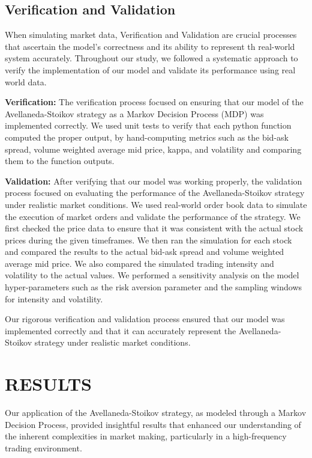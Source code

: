 \documentclass[letterpaper, 10 pt, conference]{ieeeconf}  %
\begin{document}
\subsection{Verification and Validation}
When simulating market data, Verification and Validation are crucial processes that ascertain the model's correctness and its ability to represent th real-world system accurately. Throughout our study, we followed a systematic approach to verify the implementation of our model and validate its performance using real world data. 

\textbf{Verification:} The verification process focused on ensuring that our model of the Avellaneda-Stoikov strategy as a Markov Decision Process (MDP) was implemented correctly. We used unit tests to verify that each python function computed the proper output, by hand-computing metrics such as the bid-ask spread, volume weighted average mid price, kappa, and volatility and comparing them to the function outputs. 

\textbf{Validation:} After verifying that our model was working properly, the validation process focused on evaluating the performance of the Avellaneda-Stoikov strategy under realistic market conditions. We used real-world order book data to simulate the execution of market orders and validate the performance of the strategy. We first checked the price data to ensure that it was consistent with the actual stock prices during the given timeframes. We then ran the simulation for each stock and compared the results to the actual bid-ask spread and volume weighted average mid price. We also compared the simulated trading intensity and volatility to the actual values. We performed a sensitivity analysis on the model hyper-parameters such as the risk aversion parameter and the sampling windows for intensity and volatility. 

Our rigorous verification and validation process ensured that our model was implemented correctly and that it can accurately represent the Avellaneda-Stoikov strategy under realistic market conditions.

\section{RESULTS}
Our application of the Avellaneda-Stoikov strategy, as modeled through a Markov Decision Process, provided insightful results that enhanced our understanding of the inherent complexities in market making, particularly in a high-frequency trading environment.
\end{document}
